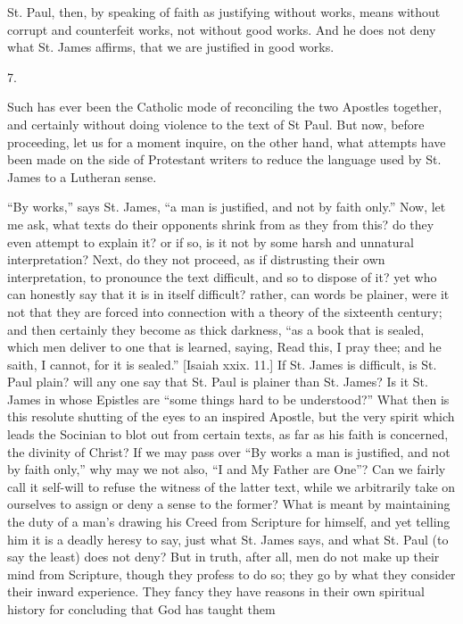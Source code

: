St. Paul, then, by speaking of faith as justifying without works,
means without corrupt and counterfeit works, not without good works.
And he does not deny what St. James affirms, that we are justified in
good works.

7.

Such has ever been the Catholic mode of reconciling the two
Apostles together, and certainly without doing violence to the text of
St Paul. But now, before proceeding, let us for a moment inquire, on
the other hand, what attempts have been made on the side of Protestant
writers to reduce the language used by St. James to a Lutheran sense.

``By works,'' says St. James, ``a man is justified, and
not by faith only.'' Now, let me ask, what texts do their
opponents shrink from as they from this? do they even attempt to
explain it? or if so, is it not by some harsh and unnatural
interpretation? Next, do they not proceed, as if distrusting their own
interpretation, to pronounce the text difficult, and so to dispose of
it? yet who can honestly say that it is in itself difficult? rather,
can words be plainer, were it not that they are forced into connection
with a theory of the sixteenth century; and then certainly they
become as thick darkness, ``as a book that is sealed, which men
deliver to one that is learned, saying, Read this, I pray thee; and he
saith, I cannot, for it is sealed.'' [Isaiah xxix. 11.] If St.
James is difficult, is St. Paul plain? will any one say that St. Paul
is plainer than St. James? Is it St. James in whose Epistles are
``some things hard to be understood?'' What then is this
resolute shutting of the eyes to an inspired Apostle, but the very
spirit which leads the Socinian to blot out from certain texts, as far
as his faith is concerned, the divinity of Christ? If we may pass over
``By works a man is justified, and not by faith only,'' why
may we not also, ``I and My Father are One''? Can we fairly
call it self-will to refuse the witness of the latter text, while we
arbitrarily take on ourselves to assign or deny a sense to the former?
What is meant by maintaining the duty of a man's drawing his Creed
from Scripture for himself, and yet telling him it is a deadly heresy
to say, just what St. James says, and what St. Paul (to say the least)
does not deny? But in truth, after all, men do not make up their mind
from Scripture, though they profess to do so; they go by what they
consider their inward experience. They fancy they have reasons in
their own spiritual history for concluding that God has taught them
